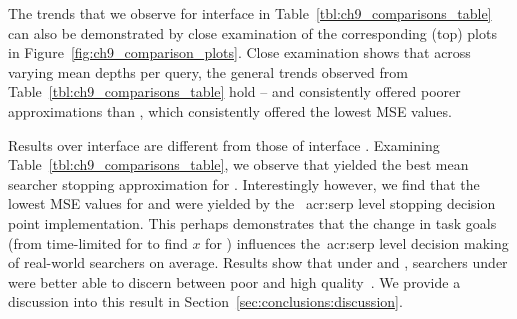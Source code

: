 The trends that we observe for interface  in Table~\ref{tbl:ch9_comparisons_table} can also be demonstrated by close examination of the corresponding (top) plots in Figure~\ref{fig:ch9_comparison_plots}. Close examination shows that across varying mean depths per query, the general trends observed from Table~\ref{tbl:ch9_comparisons_table} hold --  and  consistently offered poorer approximations than , which consistently offered the lowest MSE values.

Results over interface  are different from those of interface . Examining Table~\ref{tbl:ch9_comparisons_table}, we observe that  yielded the best mean searcher stopping approximation for . Interestingly however, we find that the lowest MSE values for  and  were yielded by the ~\gls{acr:serp} level stopping decision point implementation. This perhaps demonstrates that the change in task goals (from time-limited for  to find $x$ for ) influences the~\gls{acr:serp} level decision making of real-world searchers on average. Results show that under  and , searchers under  were better able to discern between poor and high quality~. We provide a discussion into this result in Section~\ref{sec:conclusions:discussion}.

